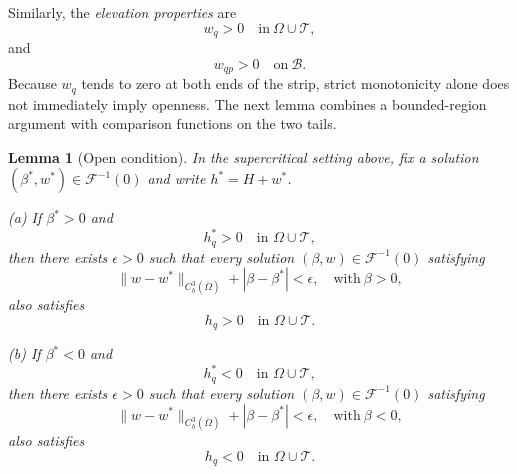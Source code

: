 \documentclass[12pt,letterpaper]{amsart}
\newtheorem{lemma}[theorem]{Lemma}
\numberwithin{equation}{section}
\begin{document}
	{Similarly, the \emph{elevation properties} are}
	\begin{equation}\label{nodalele}
		w_q>0\quad\mathrm{in~}\Omega\cup \mathcal T,
	\end{equation}
	and
	\begin{equation*}
		w_{qp}>0\quad\mathrm{on~}\mathcal B.
	\end{equation*}
	{Because $w_q$ tends to zero at both ends of the strip, strict monotonicity alone does not immediately imply openness. The next lemma combines a bounded-region argument with comparison functions on the two tails.}
	
	\begin{lemma}[Open condition]\label{lem:open}
		{In the supercritical setting above, fix a solution $(\beta^*,w^*)\in\mathcal F^{-1}(0)$ and write $h^*=H+w^*$.}
	
		(a) If \(\beta^* > 0\) and
		\[
		h_q^* > 0 \quad \text{in } \Omega \cup \mathcal{T},
		\]
		then there exists \(\epsilon > 0\) such that every solution {$(\beta,w)\in\mathcal F^{-1}(0)$} satisfying
		\[
		\|w - w^*\|_{C_b^3(\bar{\Omega})} + |\beta - \beta^*| < \epsilon, \quad \mathrm{with~}\beta > 0,
		\]
		also satisfies
		\[
		h_q > 0 \quad \text{in } \Omega \cup \mathcal{T}.
		\]
		
		(b) If \(\beta^* < 0\) and
		\[
		h_q^* < 0 \quad \text{in } \Omega \cup \mathcal{T},
		\]
		then there exists \(\epsilon > 0\) such that every solution {$(\beta,w)\in\mathcal F^{-1}(0)$} satisfying
		\[
		\|w - w^*\|_{C_b^3(\bar{\Omega})} + |\beta - \beta^*| < \epsilon, \quad\mathrm{with~} \beta < 0,
		\]
		also satisfies
		\[
		h_q < 0 \quad \text{in } \Omega \cup \mathcal{T}.
		\]
	\end{lemma}
\end{document}

